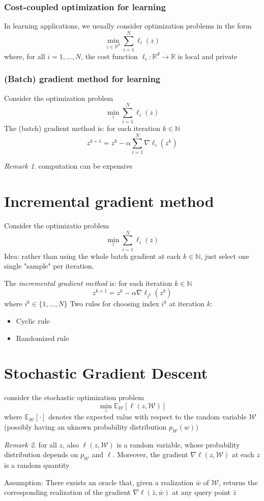 \documentclass{book}
\newcommand{\R}{\mathbb{R}}
\newcommand{\N}{\mathbb{N}}
\theoremstyle{theoremv2}
\theoremstyle{defv2}
\theoremstyle{remark}
\newtheorem*{remark}{Remark}
\theoremstyle{remark}
\theoremstyle{definition}
\theoremstyle{definition}
\begin{document}
\subsubsection{Cost-coupled optimization for learning}
In learning applications, we usually consider optimization problems in the form 
\[
    \min_{z\in\R^d}\displaystyle\sum_{i=1}^{N}\ell_i(z)
\]
where, for all $i=1,\dots,N$, the cost function $\ell_i:\R^d\to \R$ is local and private 
\subsubsection{(Batch) gradient method for learning}
Consider the optimization problem 
\[
    \min_z \displaystyle\sum_{i=1}^{N}\ell_i(z)
\]
The (batch) gradient method is: for each iteration $k\in\N$ 
\[
    z^{k+1} = z^k -\alpha \displaystyle\sum_{i=1}^{N}\nabla\ell_i(z^k)
\]
\begin{remark}
    computation can be expensive
\end{remark}
\section{Incremental gradient method}
Consider the optimizatio problem
\[
    \min_z \displaystyle\sum_{i=1}^{N}\ell_i(z)
\]
Idea: rather than using the whole batch gradient at each $k\in\N$, just select one single "sample" per iteration. 

The \emph{incremental gradient method} is: for each iteration $k\in\N$
\[
    z^{k+1} = z^k - \alpha\nabla\ell_{i^k}(z^k)
\]
where $i^k\in\{1,\dots,N\}$
Two rules for choosing index $i^k$ at iteration $k$: 
\begin{itemize}
    \item Cyclic rule 
        \item Randomized rule
\end{itemize}
\section{Stochastic Gradient Descent}
consider the stochastic optimization problem 
\[
    \min_z \mathbb{E}_{\mathcal{W}}[\ell(z,\mathcal{W})]
\]
where $\mathbb{E}_{\mathcal{W}}[\cdot]$ denotes the expected value with respect to the random variable $\mathcal{W}$ (possibly having an uknown probability distribution $p_{\mathcal{W}}(w))$
\begin{remark}
    for all $z$, also $\ell(z,\mathcal{W})$ is a random variable, whose probability distribution depends on $p_{\mathcal{W}}$ and $\ell$. Moreover, the gradient $\nabla\ell(z,\mathcal{W})$ at each $z$ is a random quantity
\end{remark}
Assumption: There exsists an oracle that, given a realization $\bar{w}$ of $\mathcal{W}$, returns the corresponding realization of the gradient $\nabla\ell(\bar{z},\bar{w})$ at any query point $\bar{z}$
\end{document}
